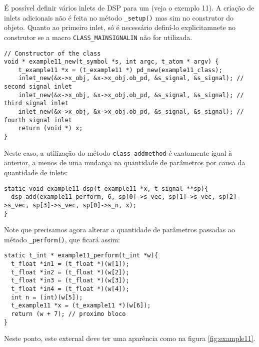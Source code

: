 É possível definir vários inlets de DSP para um \external (veja o exemplo 11).
A criação de inlets adicionais não é feita no método \texttt{\_setup()} mas
sim no construtor do objeto.
Quanto ao primeiro inlet, só é necessário definí-lo explicitamnete no construtor
se a macro \texttt{CLASS\_MAINSIGNALIN} não for utilizada.

\begin{lstlisting}[caption=Criação de vários inlets DSP]
// Constructor of the class
void * example11_new(t_symbol *s, int argc, t_atom * argv) {
    t_example11 *x = (t_example11 *) pd_new(example11_class);
    inlet_new(&x->x_obj, &x->x_obj.ob_pd, &s_signal, &s_signal); // second signal inlet
    inlet_new(&x->x_obj, &x->x_obj.ob_pd, &s_signal, &s_signal); // third signal inlet
    inlet_new(&x->x_obj, &x->x_obj.ob_pd, &s_signal, &s_signal); // fourth signal inlet
    return (void *) x;
}
\end{lstlisting}

Neste caso, a utilização do método \texttt{class\_addmethod} é exatamente
igual à anterior, a menos de uma mudança na quantidade de parâmetros por causa
da quantidade de inlets:

\begin{lstlisting}[caption=Definição do método DSP]
static void example11_dsp(t_example11 *x, t_signal **sp){
  dsp_add(example11_perform, 6, sp[0]->s_vec, sp[1]->s_vec, sp[2]->s_vec, sp[3]->s_vec, sp[0]->s_n, x);
}
\end{lstlisting}

Note que precisamos agora alterar a quantidade de parâmetros passadas ao método
\texttt{\_perform()}, que ficará assim:

\begin{lstlisting}[caption=Definição da função perform]
static t_int * example11_perform(t_int *w){
  t_float *in1 = (t_float *)(w[1]);
  t_float *in2 = (t_float *)(w[2]);
  t_float *in3 = (t_float *)(w[3]);
  t_float *in4 = (t_float *)(w[4]);
  int n = (int)(w[5]);
  t_example11 *x = (t_example11 *)(w[6]);
  return (w + 7); // proximo bloco
}
\end{lstlisting}

Neste ponto, este external deve ter uma aparência como na figura
\ref{fig:example11}.



